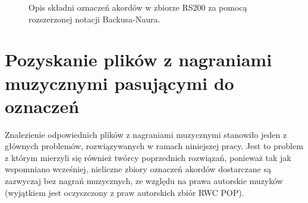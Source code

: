 \begin{figure}
    \centering
    {\scriptsize }
    \caption{Opis składni oznaczeń akordów w zbiorze RS200 za pomocą rozszerzonej notacji Backusa-Naura.}
    \label{fig:rs200_dt_syntax}
\end{figure}


\section{Pozyskanie plików z nagraniami muzycznymi pasującymi do oznaczeń}

Znalezienie odpowiednich plików z nagraniami muzycznymi stanowiło jeden z głównych problemów,
rozwiązywanych w ramach niniejszej pracy. Jest to problem z którym mierzyli się również twórcy
poprzednich rozwiązań, ponieważ tak jak wspomniano wcześniej, nieliczne zbiory oznaczeń
akordów dostarczane są zazwyczaj bez nagrań muzycznych, ze względu na prawa autorskie muzyków
(wyjątkiem jest oczyszczony z praw autorskich zbiór RWC POP).


